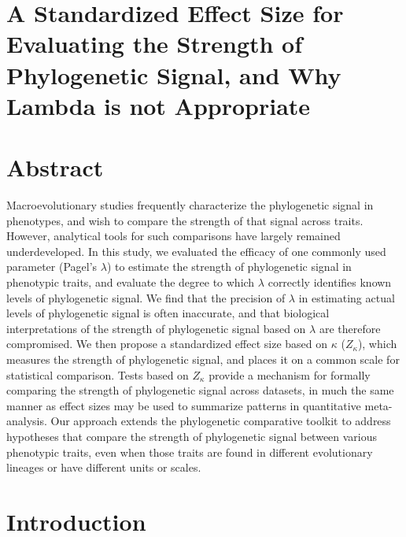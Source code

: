 \documentclass[]{article}
\author{}
\date{\vspace{-2.5em}}
\begin{document}
\hypertarget{a-standardized-effect-size-for-evaluating-the-strength-of-phylogenetic-signal-and-why-lambda-is-not-appropriate}{%
\section{A Standardized Effect Size for Evaluating the Strength of
Phylogenetic Signal, and Why Lambda is not
Appropriate}\label{a-standardized-effect-size-for-evaluating-the-strength-of-phylogenetic-signal-and-why-lambda-is-not-appropriate}}

\hfill\break

\hypertarget{abstract}{%
\section{Abstract}\label{abstract}}

Macroevolutionary studies frequently characterize the phylogenetic
signal in phenotypes, and wish to compare the strength of that signal
across traits. However, analytical tools for such comparisons have
largely remained underdeveloped. In this study, we evaluated the
efficacy of one commonly used parameter (Pagel's \(\lambda\)) to
estimate the strength of phylogenetic signal in phenotypic traits, and
evaluate the degree to which \(\lambda\) correctly identifies known
levels of phylogenetic signal. We find that the precision of \(\lambda\)
in estimating actual levels of phylogenetic signal is often inaccurate,
and that biological interpretations of the strength of phylogenetic
signal based on \(\lambda\) are therefore compromised. We then propose a
standardized effect size based on \(\kappa\) (\(Z_\kappa\)), which
measures the strength of phylogenetic signal, and places it on a common
scale for statistical comparison. Tests based on \(Z_\kappa\) provide a
mechanism for formally comparing the strength of phylogenetic signal
across datasets, in much the same manner as effect sizes may be used to
summarize patterns in quantitative meta-analysis. Our approach extends
the phylogenetic comparative toolkit to address hypotheses that compare
the strength of phylogenetic signal between various phenotypic traits,
even when those traits are found in different evolutionary lineages or
have different units or scales.

\newpage

\hypertarget{introduction}{%
\section{Introduction}\label{introduction}}
\end{document}
